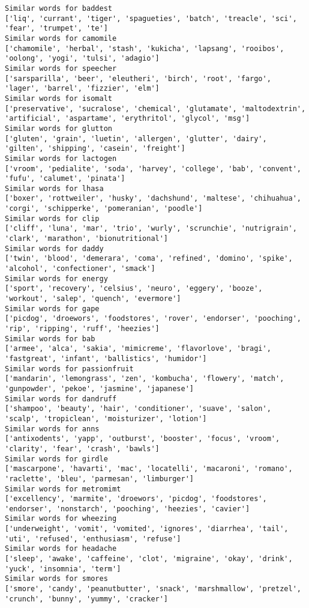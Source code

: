 \documentclass[11pt]{article}
\begin{document}
\begin{Verbatim}[commandchars=\\\{\}]
Similar words for baddest
['liq', 'currant', 'tiger', 'spagueties', 'batch', 'treacle', 'sci', 'fear', 'trumpet', 'te']
Similar words for camomile
['chamomile', 'herbal', 'stash', 'kukicha', 'lapsang', 'rooibos', 'oolong', 'yogi', 'tulsi', 'adagio']
Similar words for speecher
['sarsparilla', 'beer', 'eleutheri', 'birch', 'root', 'fargo', 'lager', 'barrel', 'fizzier', 'elm']
Similar words for isomalt
['preservative', 'sucralose', 'chemical', 'glutamate', 'maltodextrin', 'artificial', 'aspartame', 'erythritol', 'glycol', 'msg']
Similar words for glutton
['gluten', 'grain', 'luetin', 'allergen', 'glutter', 'dairy', 'gilten', 'shipping', 'casein', 'freight']
Similar words for lactogen
['vroom', 'pedialite', 'soda', 'harvey', 'college', 'bab', 'convent', 'fufu', 'calumet', 'pinata']
Similar words for lhasa
['boxer', 'rottweiler', 'husky', 'dachshund', 'maltese', 'chihuahua', 'corgi', 'schipperke', 'pomeranian', 'poodle']
Similar words for clip
['cliff', 'luna', 'mar', 'trio', 'wurly', 'scrunchie', 'nutrigrain', 'clark', 'marathon', 'bionutritional']
Similar words for daddy
['twin', 'blood', 'demerara', 'coma', 'refined', 'domino', 'spike', 'alcohol', 'confectioner', 'smack']
Similar words for energy
['sport', 'recovery', 'celsius', 'neuro', 'eggery', 'booze', 'workout', 'salep', 'quench', 'evermore']
Similar words for gape
['picdog', 'droewors', 'foodstores', 'rover', 'endorser', 'pooching', 'rip', 'ripping', 'ruff', 'heezies']
Similar words for bab
['armee', 'alca', 'sakia', 'mimicreme', 'flavorlove', 'bragi', 'fastgreat', 'infant', 'ballistics', 'humidor']
Similar words for passionfruit
['mandarin', 'lemongrass', 'zen', 'kombucha', 'flowery', 'match', 'gunpowder', 'pekoe', 'jasmine', 'japanese']
Similar words for dandruff
['shampoo', 'beauty', 'hair', 'conditioner', 'suave', 'salon', 'scalp', 'tropiclean', 'moisturizer', 'lotion']
Similar words for anns
['antixodents', 'yapp', 'outburst', 'booster', 'focus', 'vroom', 'clarity', 'fear', 'crash', 'bawls']
Similar words for girdle
['mascarpone', 'havarti', 'mac', 'locatelli', 'macaroni', 'romano', 'raclette', 'bleu', 'parmesan', 'limburger']
Similar words for metromimt
['excellency', 'marmite', 'droewors', 'picdog', 'foodstores', 'endorser', 'nonstarch', 'pooching', 'heezies', 'cavier']
Similar words for wheezing
['underweight', 'vomit', 'vomited', 'ignores', 'diarrhea', 'tail', 'uti', 'refused', 'enthusiasm', 'refuse']
Similar words for headache
['sleep', 'awake', 'caffeine', 'clot', 'migraine', 'okay', 'drink', 'yuck', 'insomnia', 'term']
Similar words for smores
['smore', 'candy', 'peanutbutter', 'snack', 'marshmallow', 'pretzel', 'crunch', 'bunny', 'yummy', 'cracker']

\end{Verbatim}
\end{document}

